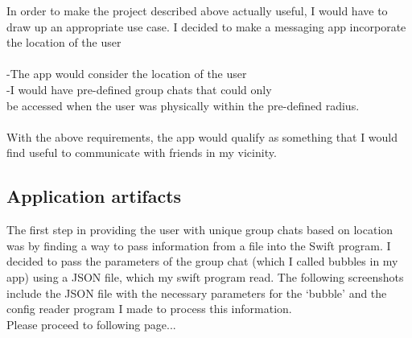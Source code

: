 \documentclass[a4paper, 11pt]{report}
\begin{document}
In order to make the project described above actually useful, I would have to draw up an appropriate use case.  I decided to make a messaging app incorporate the location of the user \\
\\
-The app would consider the location of the user\\
-I would have pre-defined group chats that could only\\ be accessed when the user was physically within the pre-defined radius.\\
\\
With the above requirements, the app would qualify as something that I would find useful to communicate with friends in my vicinity.

\subsection{Application artifacts}

The first step in providing the user with unique group chats based on location was by finding a way to pass information from a file into the Swift program. I decided to pass the parameters of the group chat (which I called bubbles in my app) using a JSON file, which my swift program read. The following screenshots include the JSON file with the necessary parameters for the ‘bubble’ and the config reader program I made to process this information.\\
Please proceed to following page...
\end{document}

